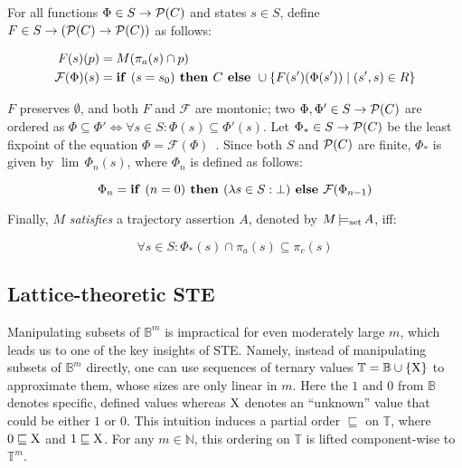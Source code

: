 For all functions $\Phi \in S \rightarrow \mathcal{P}(C)$ and states $s \in S$, define $F \in S \rightarrow (\mathcal{P}(C) \rightarrow \mathcal{P}(C))$ as follows:

\begin{align}
F(s)(p) &= M(\pi_{a}(s) \cap p) \\
\mathcal{F}(\Phi)(s) &= \textrm{\textbf{if }} (s = s_{0}) \textrm{\textbf{ then }} C \textrm{\textbf{ else }} \cup \{ F(s')(\Phi(s')) \mid (s',s) \in R \}
\end{align}

\noindent $F$ preserves $\emptyset$, and both $F$ and $\mathcal{F}$ are montonic; two $\Phi, \Phi' \in S \rightarrow \mathcal{P}(C)$ are ordered as $\Phi \subseteq \Phi' \iff \forall s \in S : \Phi(s) \subseteq \Phi'(s)$. Let $\Phi_{*} \in S \rightarrow \mathcal{P}(C)$ be the least fixpoint of the equation $\Phi = \mathcal{F}(\Phi)$~\cite{davey2002}. Since both $S$ and $\mathcal{P}(C)$ are finite, $\Phi_{*}$ is given by $\lim \, \Phi_{n}(s)$, where $\Phi_{n}$ is defined as follows:

\begin{equation}
\Phi_{n} = \textrm{\textbf{if }} (n = 0) \textrm{\textbf{ then }} (\lambda s \in S : \bot) \textrm{\textbf{ else }} \mathcal{F}(\Phi_{n-1})
\end{equation}

\noindent Finally, $M$ \textit{satisfies} a trajectory assertion $A$, denoted by $M \operatorname{\models_{\textrm{set}}} A$, iff:

\begin{equation}
\forall s \in S : \Phi_{*}(s) \cap \pi_{a}(s) \subseteq \pi_{c}(s)
\end{equation}

\subsection{Lattice-theoretic STE}

Manipulating subsets of $\mathbb{B}^{m}$ is impractical for even moderately large $m$, which leads us to one of the key insights of STE. Namely, instead of manipulating subsets of $\mathbb{B}^{m}$ directly, one can use sequences of ternary values $\mathbb{T} = \mathbb{B} \cup \{ \mathrm{X} \} $ to approximate them, whose sizes are only linear in $m$. Here the $1$ and $0$ from $\mathbb{B}$ denotes specific, defined values whereas $\mathrm{X}$ denotes an ``unknown'' value that could be either $1$ or $0$. This intuition induces a partial order $\sqsubseteq$ on $\mathbb{T}$, where $0 \sqsubseteq \mathrm{X}$ and $1 \sqsubseteq \mathrm{X}$\footnotemark. For any $m \in \mathbb{N}$, this ordering on $\mathbb{T}$ is lifted component-wise to $\mathbb{T}^{m}$.

